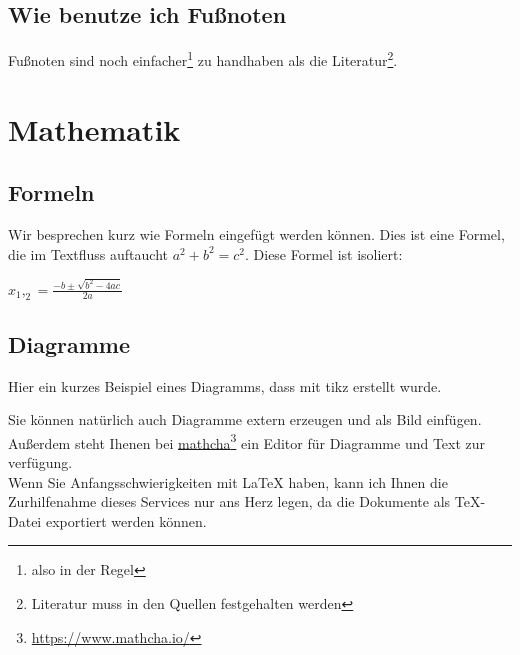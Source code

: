 \documentclass{article}
\begin{document}
    \subsection{Wie benutze ich Fußnoten}
    Fußnoten sind noch einfacher\footnote[1]{also in der Regel} zu handhaben als die Literatur\footnote[2]{Literatur muss in den Quellen festgehalten werden}.
    \newpage



    \section{Mathematik}
    \subsection{Formeln}
    Wir besprechen kurz wie Formeln eingefügt werden können.
    Dies ist eine Formel, die im Textfluss auftaucht $a^{2} + b^{2} = c^{2}$.
    Diese Formel ist isoliert:
    \begin{center}
        $x_1,_2 = \frac{-b \pm \sqrt{b^2 - 4ac}}{2a}$
    \end{center}



    \subsection{Diagramme}
    Hier ein kurzes Beispiel eines Diagramms, dass mit tikz erstellt wurde.\\[1cm]
    Sie können natürlich auch Diagramme extern erzeugen und als Bild einfügen. Außerdem steht Ihenen bei \href{https://www.mathcha.io/}{mathcha}\footnote[1]{ \href{https://www.mathcha.io/}{https://www.mathcha.io/}} ein Editor für Diagramme und Text zur verfügung.\\
    Wenn Sie Anfangsschwierigkeiten mit \LaTeX{} haben, kann ich Ihnen die Zurhilfenahme dieses Services nur ans Herz legen, da die Dokumente als TeX-Datei exportiert werden können.
    \newpage
\end{document}
